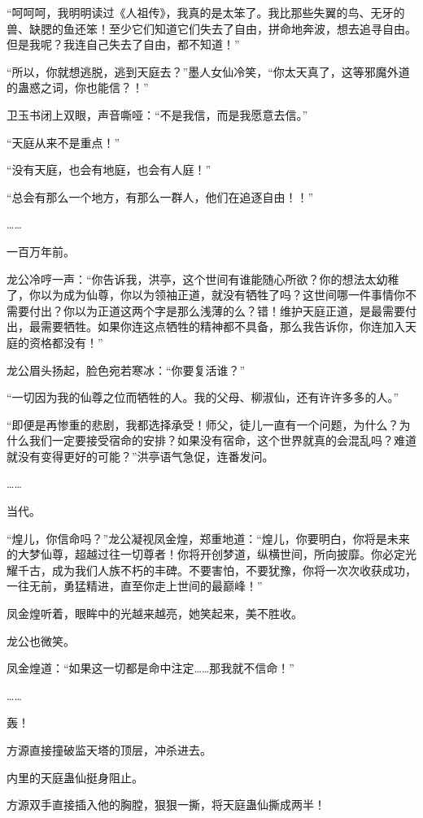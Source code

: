 \begin{this_body}
“呵呵呵，我明明读过《人祖传》，我真的是太笨了。我比那些失翼的鸟、无牙的兽、缺腮的鱼还笨！至少它们知道它们失去了自由，拼命地奔波，想去追寻自由。但是我呢？我连自己失去了自由，都不知道！”

“所以，你就想逃脱，逃到天庭去？”墨人女仙冷笑，“你太天真了，这等邪魔外道的蛊惑之词，你也能信？！”

卫玉书闭上双眼，声音嘶哑：“不是我信，而是我愿意去信。”

“天庭从来不是重点！”

“没有天庭，也会有地庭，也会有人庭！”

“总会有那么一个地方，有那么一群人，他们在追逐自由！！”

……

一百万年前。

龙公冷哼一声：“你告诉我，洪亭，这个世间有谁能随心所欲？你的想法太幼稚了，你以为成为仙尊，你以为领袖正道，就没有牺牲了吗？这世间哪一件事情你不需要付出？你以为正道这两个字是那么浅薄的么？错！维护天庭正道，是最需要付出，最需要牺牲。如果你连这点牺牲的精神都不具备，那么我告诉你，你连加入天庭的资格都没有！”

龙公眉头扬起，脸色宛若寒冰：“你要复活谁？”

“一切因为我的仙尊之位而牺牲的人。我的父母、柳淑仙，还有许许多多的人。”

“即便是再惨重的悲剧，我都选择承受！师父，徒儿一直有一个问题，为什么？为什么我们一定要接受宿命的安排？如果没有宿命，这个世界就真的会混乱吗？难道就没有变得更好的可能？”洪亭语气急促，连番发问。

……

当代。

“煌儿，你信命吗？”龙公凝视凤金煌，郑重地道：“煌儿，你要明白，你将是未来的大梦仙尊，超越过往一切尊者！你将开创梦道，纵横世间，所向披靡。你必定光耀千古，成为我们人族不朽的丰碑。不要害怕，不要犹豫，你将一次次收获成功，一往无前，勇猛精进，直至你走上世间的最巅峰！”

凤金煌听着，眼眸中的光越来越亮，她笑起来，美不胜收。

龙公也微笑。

凤金煌道：“如果这一切都是命中注定……那我就不信命！”

……

轰！

方源直接撞破监天塔的顶层，冲杀进去。

内里的天庭蛊仙挺身阻止。

方源双手直接插入他的胸膛，狠狠一撕，将天庭蛊仙撕成两半！


\end{this_body}

